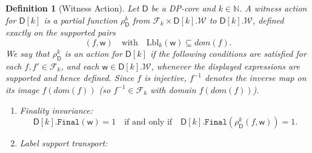 \documentclass[11pt,a4paper]{article}
\newtheorem{definition}[theorem]{Definition}
\newcommand{\treewidthvalue}{k}
\newcommand{\N}{\mathbb{N}}
\newcommand{\finalwitnessgenericcore}{\mathtt{Final}}
\newcommand{\allwitnesses}{\mathcal{W}}
\newcommand{\awitness}{\mathsf{w}}
\newcommand{\dpcore}{\mathsf{D}}
\newcommand{\domain}{dom}
\newcommand{\relabelingfunction}{f}
\newcommand{\relabelclass}{\mathcal{F}}
\newcommand{\action}{\rho}
\begin{document}


\begin{definition}[Witness Action]\label{definition:witnessaction}
Let $\dpcore$ be a DP-core and $k\in \N$. A witness action for $\dpcore[\treewidthvalue]$ is a partial function
$\action_{\dpcore}^{\treewidthvalue}$ from $\relabelclass_\treewidthvalue \times \dpcore[\treewidthvalue].\allwitnesses$ to $\dpcore[\treewidthvalue].\allwitnesses$, defined exactly on the supported pairs
\[
(\relabelingfunction,\awitness)
\quad\text{with}\quad
\mathrm{Lbl}_{\treewidthvalue}(\awitness)\subseteq \domain(\relabelingfunction).
\]
We say that $\action_{\dpcore}^{\treewidthvalue}$ is an action for $\dpcore[\treewidthvalue]$ if
the following conditions are satisfied for each $\relabelingfunction,\relabelingfunction'\in \relabelclass_{\treewidthvalue}$, and
each $\awitness \in \dpcore[\treewidthvalue].\allwitnesses$, whenever the displayed expressions are supported and hence defined.
Since $\relabelingfunction$ is injective, $\relabelingfunction^{-1}$ denotes the inverse map on its image $\relabelingfunction(\domain(\relabelingfunction))$ (so $\relabelingfunction^{-1}\in \relabelclass_\treewidthvalue$ with domain $\relabelingfunction(\domain(\relabelingfunction))$).
\begin{enumerate}
	    \item \label{condition:relabeldpcore-condition-one}
	    Finality invariance:
	    \[
	    \dpcore[\treewidthvalue].\finalwitnessgenericcore(\awitness)=1
	    \quad \text{if and only if}\quad
	    \dpcore[\treewidthvalue].\finalwitnessgenericcore(\action_{\dpcore}^{\treewidthvalue}(\relabelingfunction,\awitness))=1.
	    \]
	    \item \label{condition:relabeldpcore-condition-support-transport}
	    Label support transport:
	    \[
\]
\end{enumerate}
\end{definition}
\end{document}
